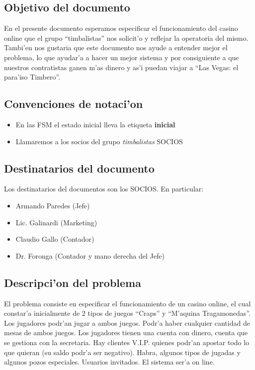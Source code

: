 \subsection{ Objetivo del documento	}
En el presente documento esperamos especificar el funcionamiento del casino online 
que el grupo ``timbalistas'' nos solicit'o y reflejar la operatoria
del mismo. Tambi'en nos gustaria que este documento nos ayude a entender mejor el problema, 
lo que ayudar'a a hacer un mejor sistema y por consiguiente a que nuestros contratistas ganen m'as dinero
y as'i puedan viajar a ``Las Vegas: el para'iso Timbero''.


\subsection{ Convenciones de notaci'on	}
\begin{itemize}
 \item En las FSM el estado inicial lleva la etiqueta \textbf{inicial}
 \item Llamaremos a los socios del grupo \textit{timbalistas} SOCIOS
\end{itemize}


\subsection{ Destinatarios del documento	}
Los destinatarios del documentos son los SOCIOS. En particular:

\begin{itemize}
    \item Armando Paredes (Jefe)
    \item Lic. Galinardi (Marketing)
    \item Claudio Gallo (Contador)
    \item Dr. Foronga (Contador y mano derecha del Jefe)
\end{itemize}


\subsection{ Descripci'on del problema }

El problema consiste en especificar el funcionamiento de un casino online, el cual constar'a inicialmente de 2 tipos
de juegos  ``Craps'' y ``M'aquina Tragamonedas''. Los jugadores podr'an jugar a ambos juegos. Podr'a haber
cualquier cantidad de mesas de ambos juegos. Los jugadores tienen una cuenta con dinero, cuenta que se gestiona con la secretaria.
Hay clientes V.I.P. quienes podr'an apostar todo lo que quieran (su saldo podr'a ser negativo).
Habra, algunos tipos de jugadas y algunos pozos especiales. Usuarios invitados.
El sistema ser'a on line.



